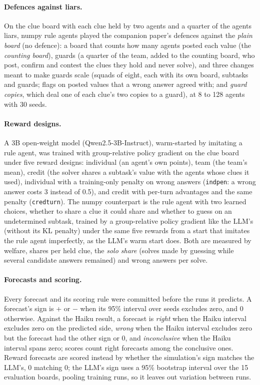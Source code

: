 \documentclass{article}
\begin{document}
\paragraph{Defences against liars.} On the clue board with each clue held by two agents and a quarter of the agents liars, numpy rule agents played the companion paper's defences against the \emph{plain board} (no defence): a board that counts how many agents posted each value (the \emph{counting board}), guards (a quarter of the team, added to the counting board, who post, confirm and contest the clues they hold and never solve), and three changes meant to make guards scale (squads of eight, each with its own board, subtasks and guards; flags on posted values that a wrong answer agreed with; and \emph{guard copies}, which deal one of each clue's two copies to a guard), at 8 to 128 agents with 30 seeds.

\paragraph{Reward designs.} A 3B open-weight model (Qwen2.5-3B-Instruct), warm-started by imitating a rule agent, was trained with group-relative policy gradient on the clue board under five reward designs: individual (an agent's own points), team (the team's mean), credit (the solver shares a subtask's value with the agents whose clues it used), individual with a training-only penalty on wrong answers (\texttt{indpen}: a wrong answer costs 3 instead of 0.5), and credit with per-turn advantages and the same penalty (\texttt{credturn}). The numpy counterpart is the rule agent with two learned choices, whether to share a clue it could share and whether to guess on an undetermined subtask, trained by a group-relative policy gradient like the LLM's (without its KL penalty) under the same five rewards from a start that imitates the rule agent imperfectly, as the LLM's warm start does. Both are measured by welfare, shares per held clue, the \emph{solo share} (solves made by guessing while several candidate answers remained) and wrong answers per solve.

\paragraph{Forecasts and scoring.} Every forecast and its scoring rule were committed before the runs it predicts. A forecast's sign is + or $-$ when its 95\% interval over seeds excludes zero, and 0 otherwise. Against the Haiku result, a forecast is \emph{right} when the Haiku interval excludes zero on the predicted side, \emph{wrong} when the Haiku interval excludes zero but the forecast had the other sign or 0, and \emph{inconclusive} when the Haiku interval spans zero; scores count right forecasts among the conclusive ones. Reward forecasts are scored instead by whether the simulation's sign matches the LLM's, 0 matching 0; the LLM's sign uses a 95\% bootstrap interval over the 15 evaluation boards, pooling training runs, so it leaves out variation between runs.
\end{document}
